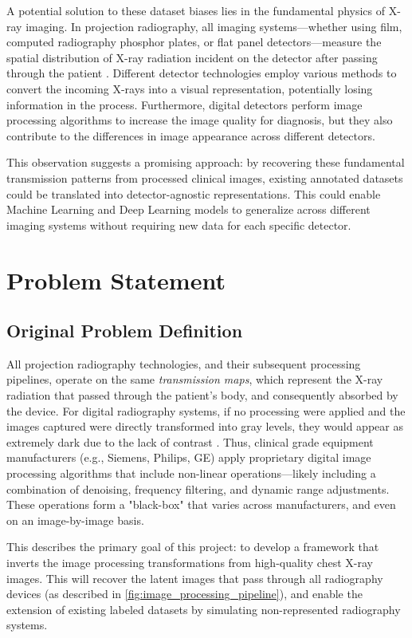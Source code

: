 \documentclass[nomenclature, english, bibtex]{kththesis}
\numberwithin{listing}{chapter}
\begin{document}
A potential solution to these dataset biases lies in the fundamental physics of X-ray imaging.
In projection radiography, all imaging systems—whether using film, computed radiography phosphor plates, or flat panel
detectors—measure the spatial distribution of X-ray radiation incident on the detector after passing through
the patient \cite{Seibert3}. Different detector technologies employ various methods to convert the incoming X-rays
into a visual representation, potentially losing information in the process. Furthermore, digital
detectors perform image processing algorithms to increase the image quality for diagnosis, but they also contribute to the
differences in image appearance across different detectors.

This observation suggests a promising approach: by recovering these fundamental transmission patterns from
processed clinical images, existing annotated datasets could be translated into detector-agnostic representations.
This could enable Machine Learning and Deep Learning models to generalize across different imaging systems without
requiring new data for each specific detector.

\section{Problem Statement}
\subsection{Original Problem Definition}

All projection radiography technologies, and their subsequent processing pipelines, operate on the same
\textit{transmission maps}, which represent the X-ray radiation that passed through the patient's body, and consequently
absorbed by the device. For digital radiography systems, if no processing were applied and the images captured were directly transformed
into gray levels, they would appear as extremely dark due to the lack of contrast \cite[p.~148]{Prokop2003}.
Thus, clinical grade equipment manufacturers (e.g., Siemens, Philips, GE) apply proprietary digital image processing
algorithms that include non-linear operations—likely including a combination of denoising, frequency filtering,
and dynamic range adjustments. These operations form a "black-box" that varies across manufacturers, and even on an
image-by-image basis.

This describes the primary goal of this project: to develop a framework that inverts the image processing transformations
from high-quality chest X-ray images. This will recover the latent images that pass through all radiography devices (as
described in \autoref{fig:image_processing_pipeline}), and enable the extension of existing labeled datasets by simulating
non-represented radiography systems.
\end{document}
